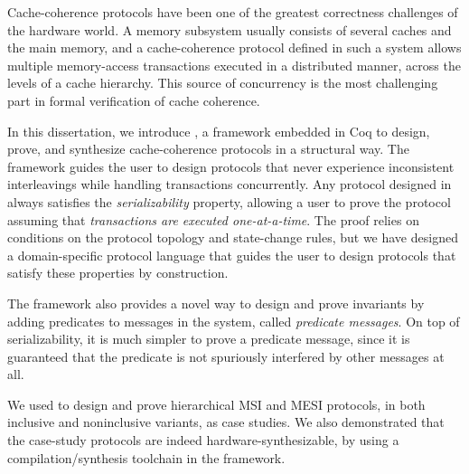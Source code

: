 
\cleardoublepage
\setcounter{savepage}{\thepage}
\begin{abstractpage}
  Cache-coherence protocols have been one of the greatest correctness challenges of the hardware world.
  A memory subsystem usually consists of several caches and the main memory, and a cache-coherence protocol defined in such a system allows multiple memory-access transactions executed in a distributed manner, across the levels of a cache hierarchy.
  This source of concurrency is the most challenging part in formal verification of cache coherence.

  In this dissertation, we introduce \hemiola{}, a framework embedded in Coq to design, prove, and synthesize cache-coherence protocols in a structural way.
  The framework guides the user to design protocols that never experience inconsistent interleavings while handling transactions concurrently.
  Any protocol designed in \hemiola{} always satisfies the \emph{serializability} property, allowing a user to prove the protocol assuming that \emph{transactions are executed one-at-a-time}.
  The proof relies on conditions on the protocol topology and state-change rules, but we have designed a domain-specific protocol language that guides the user to design protocols that satisfy these properties by construction.

  The framework also provides a novel way to design and prove invariants by adding predicates to messages in the system, called \emph{predicate messages}.
  On top of serializability, it is much simpler to prove a predicate message, since it is guaranteed that the predicate is not spuriously interfered by other messages at all.

  We used \hemiola{} to design and prove hierarchical MSI and MESI protocols, in both inclusive and noninclusive variants, as case studies.
  We also demonstrated that the case-study protocols are indeed hardware-synthesizable, by using a compilation/synthesis toolchain in the framework.
\end{abstractpage}

